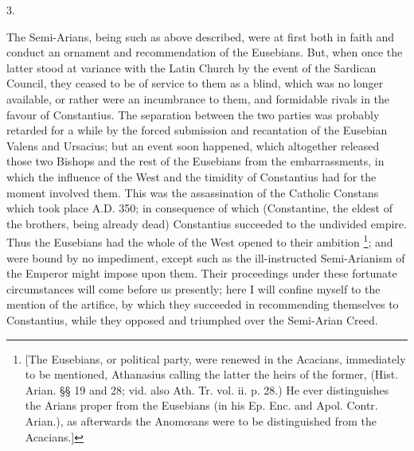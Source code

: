3.

The Semi-Arians, being such as above described, were at first both
in faith and conduct an ornament and recommendation of the Eusebians.
But, when once the latter stood at variance with the Latin Church by
the event of the Sardican Council, they ceased to be of service to
them as a blind, which was no longer available, or rather were an
incumbrance to them, and formidable rivals in the favour of
Constantius. The separation between the two parties was probably
retarded for a while by the forced submission and recantation of the
Eusebian Valens and Ursacius; but an event soon happened, which
altogether released those two Bishops and the rest of the Eusebians
from the embarrassments, in which the influence of the West and the
timidity of Constantius had for the moment involved them. This was the
assassination of the Catholic Constans which took place A.D.
350; in consequence of which (Constantine, the eldest of the brothers,
being already dead) Constantius succeeded to the undivided empire.
Thus the Eusebians had the whole of the West opened to their ambition
\footnote{[The Eusebians, or political party, were
renewed in the Acacians, immediately to be mentioned, Athanasius
calling the latter the heirs of the former, (Hist. Arian. §§ 19 and
28; vid. also Ath. Tr. vol. ii. p. 28.) He ever distinguishes the
Arians proper from the Eusebians (in his Ep. Enc. and Apol. Contr.
Arian.), as afterwards the Anomœans were to be distinguished from the
Acacians.]}; and were bound
by no impediment, except such as the ill-instructed Semi-Arianism of
the Emperor might impose upon them. Their proceedings under these
fortunate circumstances will come before us presently; here I will
confine myself to the mention of the artifice, by which they succeeded
in recommending themselves to Constantius, while they opposed and
triumphed over the Semi-Arian Creed.

